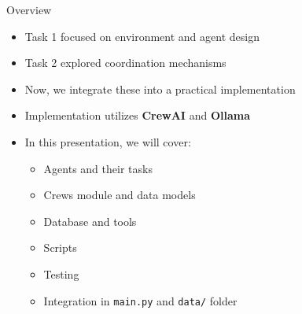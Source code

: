 \begin{frame}{Overview}
    \begin{itemize}
        \item Task 1 focused on environment and agent design
        \item Task 2 explored coordination mechanisms
        \item Now, we integrate these into a practical implementation
        \item Implementation utilizes \textbf{CrewAI} and \textbf{Ollama}
        \item In this presentation, we will cover:
        \begin{itemize}
            \item Agents and their tasks
            \item Crews module and data models
            \item Database and tools
            \item Scripts
            \item Testing
            \item Integration in \texttt{main.py} and \texttt{data/} folder
        \end{itemize}
    \end{itemize}
\end{frame}
